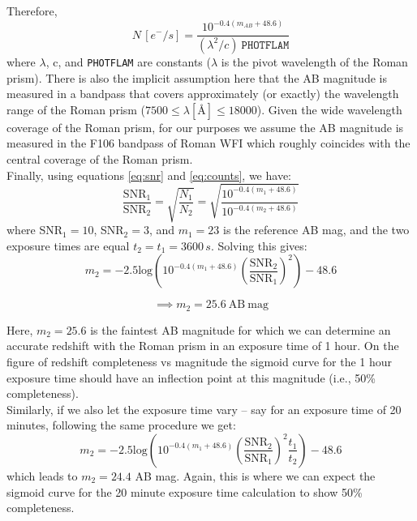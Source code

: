 \documentclass[12pt]{article}
\begin{document}
Therefore, \\
\begin{equation}
\label{eq:counts}
N\, [e^-/s] = \frac{10^{-0.4(m_{AB} + 48.6)}}{(\lambda^2/c)\ \texttt{PHOTFLAM}}
\end{equation}
where $\lambda$, c, and \texttt{PHOTFLAM} are constants ($\lambda$ is the pivot wavelength of the Roman prism). There is also the implicit assumption here that the AB magnitude is measured in a bandpass that covers approximately (or exactly) the wavelength range of the Roman prism ($7500 \leq \lambda [\text{\AA}] \leq 18000$). Given the wide wavelength coverage of the Roman prism, for our purposes we assume the AB magnitude is measured in the F106 bandpass of Roman WFI which roughly coincides with the central coverage of the Roman prism.\\

Finally, using equations \ref{eq:snr} and \ref{eq:counts}, we have:
\begin{equation}
\label{eq:snr_ratio}
\mathrm{\frac{SNR_1}{SNR_2}} = \sqrt{\frac{N_1}{N_2}} = \sqrt{ \frac{10^{-0.4(m_1 + 48.6)}}{10^{-0.4(m_2 + 48.6)}} }
\end{equation}
where SNR$_1=10$, SNR$_2=3$, and $m_1 = 23$ is the reference AB mag, and the two exposure times are equal $t_2 = t_1 = 3600\, s$. Solving this gives:
\begin{equation}
m_2 = -2.5 \mathrm{log} \left( 10^{-0.4(m_1 + 48.6)} \left(\mathrm{ \frac{SNR_2}{SNR_1} }\right)^2 \right) - 48.6
\end{equation}

\begin{equation}
\boxed{
\implies m_2 = 25.6\ \mathrm{ AB\ mag}
}
\end{equation}

Here, $m_2 = 25.6$ is the faintest AB magnitude for which we can determine an accurate redshift with the Roman prism in an exposure time of 1 hour. On the figure of redshift completeness vs magnitude the sigmoid curve for the 1 hour exposure time should have an inflection point at this magnitude (i.e., 50\% completeness).\\

Similarly, if we also let the exposure time vary -- say for an exposure time of 20 minutes, following the same procedure we get:\\
\begin{equation}
m_2 = -2.5 \mathrm{log} \left( 10^{-0.4(m_1 + 48.6)} \left(\mathrm{ \frac{SNR_2}{SNR_1} }\right)^2 \frac{t_1}{t_2} \right) - 48.6
\end{equation}
which leads to $m_2 = 24.4$ AB mag. Again, this is where we can expect the sigmoid curve for the 20 minute exposure time calculation to show 50\% completeness.\\
\end{document}
